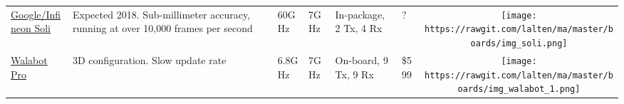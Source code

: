 \begin{longtable}[]{@{}llllllc@{}}
\begin{minipage}[t]{0.09\columnwidth}\raggedright\strut
	\href{https://www.infineon.com/cms/en/product/promopages/soli/}{Google/Infineon Soli}
\strut\end{minipage} &
\begin{minipage}[t]{0.13\columnwidth}\raggedright\strut
Expected 2018. Sub-millimeter accuracy, running at over 10,000 frames per second \cite{Lien2016}
\strut\end{minipage} &
\begin{minipage}[t]{0.09\columnwidth}\raggedright\strut
60GHz
\strut\end{minipage} &
\begin{minipage}[t]{0.11\columnwidth}\raggedright\strut
7GHz
\strut\end{minipage} &
\begin{minipage}[t]{0.10\columnwidth}\raggedright\strut
In-package, 2 Tx, 4 Rx
\strut\end{minipage} &
\begin{minipage}[t]{0.15\columnwidth}\raggedright\strut
?
\strut\end{minipage} &
\begin{minipage}[t]{0.10\columnwidth}\centering\strut
\texttt{[image: https://rawgit.com/lalten/ma/master/boards/img\_soli.png]}
\strut\end{minipage}\tabularnewline

\begin{minipage}[t]{0.09\columnwidth}\raggedright\strut
	\href{https://walabot.com/store/us/products/walabot-developer-pack.html}{Walabot Pro}
\strut\end{minipage} &
\begin{minipage}[t]{0.13\columnwidth}\raggedright\strut
3D configuration. Slow update rate
\strut\end{minipage} &
\begin{minipage}[t]{0.09\columnwidth}\raggedright\strut
6.8GHz
\strut\end{minipage} &
\begin{minipage}[t]{0.11\columnwidth}\raggedright\strut
7GHz
\strut\end{minipage} &
\begin{minipage}[t]{0.10\columnwidth}\raggedright\strut
On-board, 9 Tx, 9 Rx
\strut\end{minipage} &
\begin{minipage}[t]{0.15\columnwidth}\raggedright\strut
\$599
\strut\end{minipage} &
\begin{minipage}[t]{0.10\columnwidth}\centering\strut
\texttt{[image: https://rawgit.com/lalten/ma/master/boards/img\_walabot\_1.png]}
\strut\end{minipage}\tabularnewline


\end{longtable}
